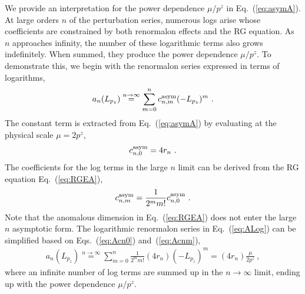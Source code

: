 \documentclass[a4paper,11pt]{article}
\begin{document}
We provide an interpretation for the power dependence $\mu/p^z$ in Eq.~(\ref{eq:asymA}). At large orders $n$ of the perturbation series, numerous logs arise whose coefficients are constrained by both renormalon effects and the RG equation. As $n$ approaches infinity, the number of these logarithmic terms also grows indefinitely. When summed, they produce the power dependence $\mu/p^z$. To demonstrate this, we begin with the renormalon series expressed in terms of logarithms,
\begin{align}\label{eq:ALog}
a_n(L_{p_z}) \stackrel{n \rightarrow \infty}{=} \sum_{m=0}^{n} c^{\rm asym}_{n,m} (-L_{p_z})^m \ .
\end{align}
The constant term is extracted from Eq.~(\ref{eq:asymA}) by evaluating at the physical scale $\mu=2 p^z$,
\begin{align}\label{eq:Acn0}
    c^{\rm asym}_{n,0} = 4 r_{n} \ .
\end{align}
The coefficients for the log terms in the large $n$ limit can be derived from the RG equation Eq.~(\ref{eq:RGEA}),
\begin{align}\label{eq:Acnm}
    c^{\rm asym}_{n,m} = \frac{1}{2^m m!} c^{\rm asym}_{n,0} \ .
\end{align}
Note that the anomalous dimension in Eq.~(\ref{eq:RGEA}) does not enter the large $n$ asymptotic form. 
The logarithmic renormalon series in Eq.~(\ref{eq:ALog}) can be simplified based on Eqs.~(\ref{eq:Acn0}) and~(\ref{eq:Acnm}), 
\begin{align}
a_n(L_{p_z}) \stackrel{n \rightarrow \infty}{=} \sum_{m=0}^{n} \frac{1}{2^m m!} (4 r_{n}) (-L_{p_z})^m =  (4 r_{n}) \frac{\mu}{2 p^z}\ ,
\end{align}
where an infinite number of log terms are summed up in the $n \rightarrow \infty$ limit, ending up with the power dependence $\mu/p^z$. 
\end{document}
